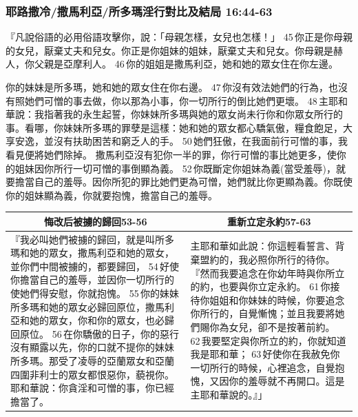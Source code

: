 \subsubsection{耶路撒冷/撒馬利亞/所多瑪淫行對比及結局 16:44-63}
『凡說俗語的必用俗語攻擊你，說：「母親怎樣，女兒也怎樣！」 45 你正是你母親的女兒，厭棄丈夫和兒女。你正是你姐妹的姐妹，厭棄丈夫和兒女。你母親是赫人，你父親是亞摩利人。 46 你的姐姐是撒馬利亞，她和她的眾女住在你左邊。

你的妹妹是所多瑪，她和她的眾女住在你右邊。 47 你沒有效法她們的行為，也沒有照她們可憎的事去做，你以那為小事，你一切所行的倒比她們更壞。 48 主耶和華說：我指著我的永生起誓，你妹妹所多瑪與她的眾女尚未行你和你眾女所行的事。看哪，你妹妹所多瑪的罪孽是這樣：她和她的眾女都心驕氣傲，糧食飽足，大享安逸，並沒有扶助困苦和窮乏人的手。 50 她們狂傲，在我面前行可憎的事，我看見便將她們除掉。
撒馬利亞沒有犯你一半的罪，你行可憎的事比她更多，使你的姐妹因你所行一切可憎的事倒顯為義。 52 你既斷定你姐妹為義(當受羞辱)，就要擔當自己的羞辱。因你所犯的罪比她們更為可憎，她們就比你更顯為義。你既使你的姐妹顯為義，你就要抱愧，擔當自己的羞辱。

\begin{table}[H]
\centering
\begin{tabular}{p{8.5cm}|p{9.0cm}}\hline\hline
\multicolumn{1}{c|}{悔改后被擄的歸回53-56}&\multicolumn{1}{c}{重新立定永約57-63}\\\hline
『我必叫她們被擄的歸回，就是叫所多瑪和她的眾女，撒馬利亞和她的眾女，並你們中間被擄的，都要歸回， 54 好使你擔當自己的羞辱，並因你一切所行的使她們得安慰，你就抱愧。 55 你的妹妹所多瑪和她的眾女必歸回原位，撒馬利亞和她的眾女，你和你的眾女，也必歸回原位。 56 在你驕傲的日子，你的惡行沒有顯露以先，你的口就不提你的妹妹所多瑪。那受了凌辱的亞蘭眾女和亞蘭四圍非利士的眾女都恨惡你，藐視你。耶和華說：你貪淫和可憎的事，你已經擔當了。
&主耶和華如此說：你這輕看誓言、背棄盟約的，我必照你所行的待你。『然而我要追念在你幼年時與你所立的約，也要與你立定永約。 61 你接待你姐姐和你妹妹的時候，你要追念你所行的，自覺慚愧；並且我要將她們賜你為女兒，卻不是按著前約。 62 我要堅定與你所立的約，你就知道我是耶和華； 63 好使你在我赦免你一切所行的時候，心裡追念，自覺抱愧，又因你的羞辱就不再開口。這是主耶和華說的。』」\\\hline
\end{tabular}
\end{table}


